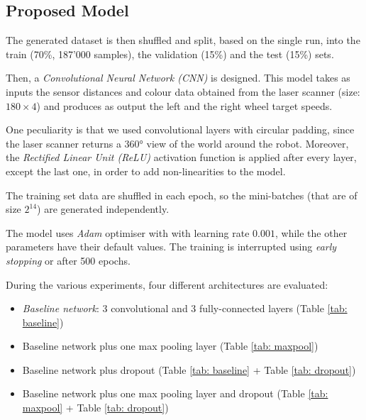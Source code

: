 \subsection{Proposed Model}
The generated dataset is then shuffled and split, based on the single run, into 
the train (70\%, 187'000 samples), the validation (15\%) and the test (15\%) 
sets.

Then, a \emph{Convolutional Neural Network (CNN)} is designed. This model takes 
as inputs the sensor distances and colour data obtained from the laser scanner 
(size: $180 \times 4$) and produces as output the left and the right wheel 
target speeds. 

One peculiarity is that we used convolutional layers with circular padding, 
since the laser scanner returns a 360° view of the world around the robot.
Moreover, the \emph{Rectified Linear Unit (ReLU)} activation function is 
applied after every layer, except the last one, in order to add non-linearities 
to the model. 

The training set data are shuffled in each epoch, so the mini-batches (that are 
of size $2^14$) are generated independently. 

The model uses \emph{Adam} optimiser with with learning rate $0.001$, while the 
other parameters have their default values. The training is interrupted using 
\emph{early stopping} or after 500 epochs. 

During the various experiments, four different architectures are evaluated:
\begin{itemize}
	\item \emph{Baseline network}: 3 convolutional and 3 fully-connected
	layers (Table \ref{tab: baseline})
	\item Baseline network plus one max pooling layer (Table \ref{tab: maxpool})
	\item Baseline network plus dropout (Table \ref{tab: baseline} + Table 
	\ref{tab: dropout})
	\item Baseline network plus one max pooling layer and dropout (Table 
	\ref{tab: maxpool} + Table \ref{tab: dropout})
\end{itemize} 

